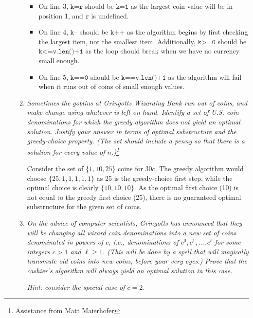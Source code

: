 \documentclass[12pt]{article}
\begin{document}
\begin{enumerate}
\begin{enumerate}
    \begin{itemize}
        \item On line 3, $\texttt{k=r}$ should be $\texttt{k=1}$ as the largest coin value will be in position 1, and $\texttt{r}$ is undefined.
        \item On line 4, $\texttt{k--}$ should be $\texttt{k++}$ as the algorithm begins by first checking the largest item, not the smallest item. Additionally, $\texttt{k>=0}$ should be $\texttt{k<=v.len()+1}$ as the loop should 
break when we have no currency small enough.
        \item On line 5, $\texttt{k==0}$ should be $\texttt{k==v.len()+1}$ as the algorithm will fail when it runs out of coins of small enough values.
    \end{itemize}
    
	\item \textit{Sometimes the goblins at Gringotts Wizarding Bank run out of coins, and make change using whatever is left on hand. Identify a set of U.S. coin denominations for which the greedy algorithm does not yield an 
optimal solution. Justify your answer in terms of optimal substructure and the greedy-choice property. (The set should include a penny so that there is a solution for every value of $n$.)\footnote{Assistance from Matt Maierhofer}}

	Consider the set of $\{1,10,25\}$ coins for $30c$. The greedy algorithm would choose $\{25, 1, 1, 1, 1, 1\}$ as 25 is the greedy-choice first step, while the optimal choice is clearly $\{10,10,10\}$. As the optimal first 
choice (10) is not equal to the greedy first choice (25), there is no guaranteed optimal substructure for the given set of coins. \\
	
	\item \textit{On the advice of computer scientists, Gringotts has announced that they will be changing all wizard coin denominations into a new set of coins denominated in powers of $c$, i.e., denominations of $c^{0}, 
c^{1}, \dots , c^{\ell}$ for some integers $c>1$ and $\ell\geq 1$. (This will be done by a spell that will magically transmute old coins into new coins, before your very eyes.) Prove that the cashier's algorithm will always yield 
an optimal solution in this case.}

	\textit{Hint: consider the special case of $c=2$.}\\
	
	

\end{enumerate}
\end{enumerate}
\end{document}
